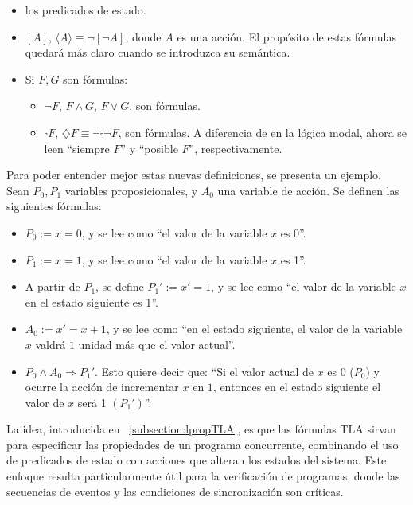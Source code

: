 \begin{itemize}
    \item los predicados de estado.
    \item $[A]$, $\langle A \rangle \equiv \neg[\neg A]$, donde $A$ es una acción. El propósito de estas fórmulas quedará más claro cuando se introduzca su semántica.
    \item Si $F,G$ son fórmulas:
    \begin{itemize}
        \item $\neg F$, $F \land G$, $F \lor G$, son fórmulas.
        \item $\square F$, $\diamondsuit F \equiv \neg \square \neg F$, son fórmulas. A diferencia de en la lógica modal, ahora se leen ``siempre $F$'' y ``posible $F$'', respectivamente.
    \end{itemize}
\end{itemize}

Para poder entender mejor estas nuevas definiciones, se presenta un ejemplo. Sean $P_0,P_1$ variables proposicionales, y $A_0$ una variable de acción. Se definen las siguientes fórmulas:

\begin{itemize}
    \item $P_0 := x = 0$, y se lee como ``el valor de la variable $x$ es 0''.
    \item $P_1 := x = 1$, y se lee como ``el valor de la variable $x$ es 1''.
    \item A partir de $P_1$, se define $P_1' := x' = 1$, y se lee como ``el valor de la variable $x$ en el estado siguiente es 1''.
    \item $A_0 := x' = x+1$, y se lee como ``en el estado siguiente, el valor de la variable $x$ valdrá $1$ unidad más que el valor actual''. 

    \item $P_0 \land A_0 \Rightarrow P_1'$. Esto quiere decir que: ``Si el valor actual de $x$ es 0 ($P_0$) y ocurre la acción de incrementar $x$ en $1$, entonces en el estado siguiente el valor de $x$ será 1 $(P_1')$''.
\end{itemize}

La idea, introducida en ~\ref{subsection:lpropTLA}, es que las fórmulas TLA sirvan para especificar las propiedades de un programa concurrente, combinando el uso de predicados de estado con acciones que alteran los estados del sistema. Este enfoque resulta particularmente útil para la verificación de programas, donde las secuencias de eventos y las condiciones de sincronización son críticas.

